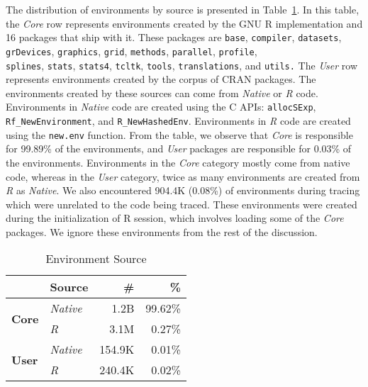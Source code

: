 \documentclass[10pt,review,sigplan,anonymous=true,authorversion=true,nonacm=true]{acmart}
\newcommand{\code}[1]{\lstinline |#1|\xspace}
\newcommand{\newEnv}{\code{new.env}}
\begin{document}
The distribution of environments by source is presented in
Table~\ref{table:env_source}. In this table, the \emph{Core} row represents
environments created by the GNU R implementation and 16 packages that ship with
it. These packages are \code{base}, \code{compiler}, \code{datasets},
\code{grDevices}, \code{graphics}, \code{grid}, \code{methods}, \code{parallel},
\code{profile}, \\\code{splines}, \code{stats}, \code{stats4}, \code{tcltk},
\code{tools}, \code{translations}, and \code{utils.} The \emph{User} row
represents environments created by the corpus of CRAN packages. The environments
created by these sources can come from \emph{Native} or \emph{R} code.
Environments in \emph{Native} code are created using the C APIs:
\code{allocSExp}, \\\code{Rf_NewEnvironment}, and \code{R_NewHashedEnv}.
Environments in \emph{R} code are created using the \newEnv function. From the
table, we observe that \emph{Core} is responsible for 99.89\% of the
environments, and \emph{User} packages are responsible for 0.03\% of the
environments. Environments in the \emph{Core} category mostly come from native
code, whereas in the \emph{User} category, twice as many environments are
created from \emph{R} as \emph{Native}. We also encountered 904.4K (0.08\%) of
environments during tracing which were unrelated to the code being traced. These
environments were created during the initialization of R session, which involves
loading some of the \emph{Core} packages. We ignore these environments from the
rest of the discussion.

\begin{table}[!h]
  \small
  \centering
  \caption{Environment Source}\label{table:env_source}
  \vspace{-3mm}
  \begin{tabular}{llrr}
    \toprule
    &\textbf{Source}&\textbf{\#}&\textbf{\%}\\
    \midrule
    \multirow{2}{*}{\textbf{Core}}  & \multicolumn{1}{l}{\emph{Native}} & \multicolumn{1}{r}{1.2B} & \multicolumn{1}{r}{99.62\%}\\
                                    & \multicolumn{1}{l}{\emph{R}}      & \multicolumn{1}{r}{3.1M} & \multicolumn{1}{r}{0.27\%}\\
    \midrule
    \multirow{2}{*}{\textbf{User}}  & \multicolumn{1}{l}{\emph{Native}} & \multicolumn{1}{r}{154.9K} & \multicolumn{1}{r}{0.01\%}\\
                                    & \multicolumn{1}{l}{\emph{R}}      & \multicolumn{1}{r}{240.4K} & \multicolumn{1}{r}{0.02\%}\\
    \bottomrule
  \end{tabular}
\end{table}
\end{document}
